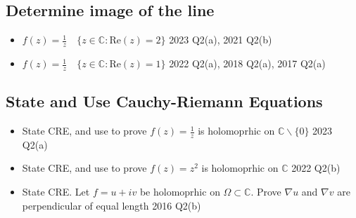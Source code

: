 \documentclass[a4paper, 8pt]{extarticle}
\begin{document}
\subsection{Determine image of the line}
\begin{itemize}
    \item $f(z) = \frac{1}{z} \quad \{z \in \mathbb{C}: \text{Re}(z) = 2\}$ \hfill 2023 Q2(a), 2021 Q2(b)
    \item $f(z) = \frac{1}{z} \quad \{z \in \mathbb{C}: \text{Re}(z) = 1\}$ \hfill 2022 Q2(a), 2018 Q2(a), 2017 Q2(a)
\end{itemize}
\subsection{State and Use Cauchy-Riemann Equations}
\begin{itemize}
    \item State CRE, and use to prove $f(z) = \frac{1}{z}$ is holomoprhic on $\mathbb{C} \backslash \{0\}$ \hfill 2023 Q2(a)
    \item State CRE, and use to prove $f(z) = z^2$ is holomoprhic on $\mathbb{C}$ \hfill 2022 Q2(b)
    \item State CRE. Let $f = u+iv$ be holomoprhic on $\Omega \subset \mathbb{C}$. Prove $\nabla u$ and $\nabla v$ are perpendicular of equal length \hfill 2016 Q2(b)
\end{itemize}
\end{document}
